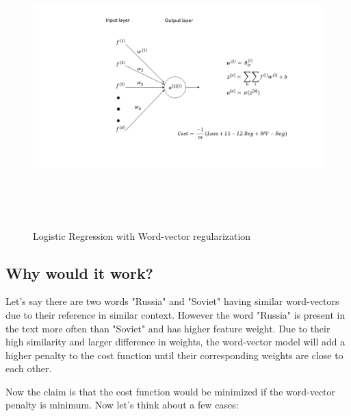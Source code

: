 \begin{figure}[htbp]
\centering
\includegraphics[width=16cm, height=10cm]{images/model3.png}\\
\centering
\caption{Logistic Regression with Word-vector regularization}
\label{fig:foo}
\end{figure}

\newpage
\subsection{Why would it work?}

Let's say there are two words "Russia" and "Soviet" having similar word-vectors due to their reference in similar context. However the word "Russia" is present in the text more often than "Soviet" and has higher feature weight. Due to their high similarity and larger difference in weights, the word-vector model will add a higher penalty to the cost function until their corresponding weights are close to each other.

Now the claim is that the cost function would be minimized if the word-vector penalty is minimum. Now let's think about a few cases: 

